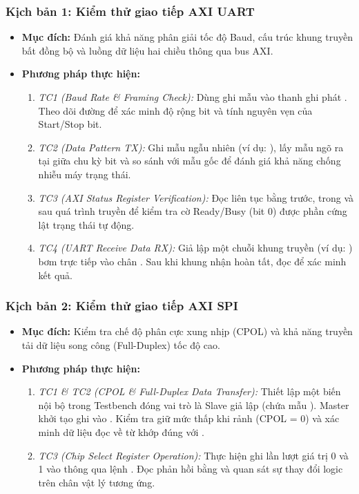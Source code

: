 \subsubsection{Kịch bản 1: Kiểm thử giao tiếp AXI UART}
\begin{itemize}
    \item \textbf{Mục đích:} Đánh giá khả năng phân giải tốc độ Baud, cấu trúc khung truyền bất đồng bộ và luồng dữ liệu hai chiều thông qua bus AXI.
    \item \textbf{Phương pháp thực hiện:}
        \begin{enumerate}
            \item \textit{TC1 (Baud Rate \& Framing Check):} Dùng  ghi mẫu  vào thanh ghi phát . Theo dõi đường  để xác minh độ rộng bit và tính nguyên vẹn của Start/Stop bit.
            \item \textit{TC2 (Data Pattern TX):} Ghi mẫu ngẫu nhiên (ví dụ: ), lấy mẫu ngõ ra tại giữa chu kỳ bit và so sánh với mẫu gốc để đánh giá khả năng chống nhiễu máy trạng thái.
            \item \textit{TC3 (AXI Status Register Verification):} Đọc liên tục  bằng  trước, trong và sau quá trình truyền để kiểm tra cờ Ready/Busy (bit 0) được phần cứng lật trạng thái tự động.
            \item \textit{TC4 (UART Receive Data RX):} Giả lập một chuỗi khung truyền (ví dụ: ) bơm trực tiếp vào chân . Sau khi khung nhận hoàn tất, đọc  để xác minh kết quả.
        \end{enumerate}
\end{itemize}

\subsubsection{Kịch bản 2: Kiểm thử giao tiếp AXI SPI}
\begin{itemize}
    \item \textbf{Mục đích:} Kiểm tra chế độ phân cực xung nhịp (CPOL) và khả năng truyền tải dữ liệu song công (Full-Duplex) tốc độ cao.
    \item \textbf{Phương pháp thực hiện:}
        \begin{enumerate}
            \item \textit{TC1 \& TC2 (CPOL \& Full-Duplex Data Transfer):} Thiết lập một biến nội bộ trong Testbench đóng vai trò là Slave giả lập (chứa mẫu ). Master khởi tạo ghi  vào . Kiểm tra  giữ mức thấp khi rảnh (CPOL = 0) và xác minh dữ liệu đọc về từ  khớp đúng với .
            \item \textit{TC3 (Chip Select Register Operation):} Thực hiện ghi lần lượt giá trị 0 và 1 vào  thông qua lệnh . Đọc phản hồi bằng  và quan sát sự thay đổi logic trên chân vật lý  tương ứng.
        \end{enumerate}
\end{itemize}

